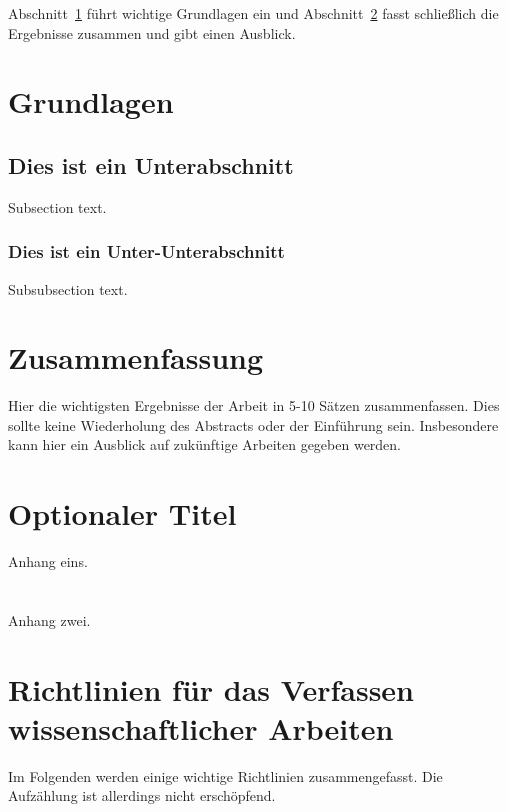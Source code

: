 \documentclass[journal,final,a4paper,twoside]{PS}
\begin{document}
Abschnitt~\ref{sec:grundlangen} führt wichtige Grundlagen ein und Abschnitt~\ref{sec:zus} fasst schließlich die Ergebnisse zusammen und gibt einen Ausblick.

\section{Grundlagen}
\label{sec:grundlangen}

\subsection{Dies ist ein Unterabschnitt}
Subsection text.
\subsubsection{Dies ist ein Unter-Unterabschnitt}
Subsubsection text.




\section{Zusammenfassung}
\label{sec:zus}
Hier die wichtigsten Ergebnisse der Arbeit in 5-10 Sätzen zusammenfassen. Dies sollte keine Wiederholung des Abstracts oder der Einführung sein. Insbesondere kann hier ein Ausblick auf zukünftige Arbeiten gegeben werden.


\appendices
\section{Optionaler Titel}
Anhang eins.
\section{}
Anhang zwei.

\section{Richtlinien für das Verfassen wissenschaftlicher Arbeiten}
\label{sec:richtlinien}
Im Folgenden werden einige wichtige Richtlinien zusammengefasst. Die Aufzählung ist allerdings nicht erschöpfend.
\end{document}
